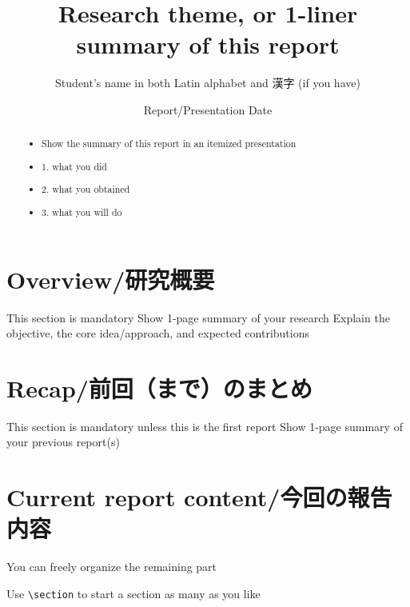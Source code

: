 \documentclass[]{lrlabreport}
\title{Research theme, or 1-liner summary of this report}
\author{Student's name in both Latin alphabet and 漢字 (if you have)}
\date{Report/Presentation Date}
\begin{document}
\maketitle
\begin{abstract}
\noindent\begin{itemize}
    \item Show the summary of this report in an itemized presentation
    \item 1. what you did
    \item 2. what you obtained
    \item 3. what you will do
\end{itemize}
\end{abstract}
\thispagestyle{empty}


\section{Overview/研究概要}

\I This section is mandatory
\I Show 1-page summary of your research 
\I Explain the objective, the core idea/approach, and expected contributions


\section{Recap/前回（まで）のまとめ}

\I This section is mandatory unless this is the first report
\I Show 1-page summary of your previous report(s)


\section{Current report content/今回の報告内容}

\I You can freely organize the remaining part

\I Use \verb|\section| to start a section as many as you like
\end{document}
